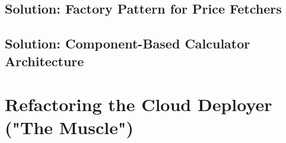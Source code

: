 \subsection{Solution: Factory Pattern for Price Fetchers}
%
%
%
%

\subsection{Solution: Component-Based Calculator Architecture}
%
%
%
%

\section{Refactoring the Cloud Deployer ("The Muscle")}

